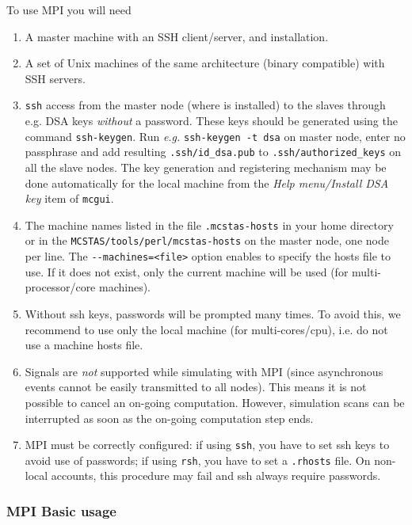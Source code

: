 To use MPI you will need
  \begin{enumerate}
  \item{A master machine with an SSH client/server, and \MCS installation.}
  \item{A set of Unix machines of the same architecture (binary compatible) with
      SSH servers.}
  \item{ \texttt{ssh} access from the master node (where \MCS is
      installed) to the slaves through e.g. DSA keys \emph{without} a
      password. These keys should be generated using the command
      \texttt{ssh-keygen}. Run \emph{e.g.} \texttt{ssh-keygen -t dsa} on
      master node, enter no passphrase and add resulting
      \texttt{.ssh/id\_dsa.pub} to \texttt{.ssh/authorized\_keys}
      on all the slave nodes. The key generation and registering mechanism
      may be done automatically for the local machine from the
      \emph{Help menu/Install DSA key} item of \verb+mcgui+.}
  \item{The machine names listed in the file \texttt{.mcstas-hosts} in
      your home directory or in the \texttt{MCSTAS/tools/perl/mcstas-hosts} on
      the master node, one node per line. The \verb'--machines=<file>' option
      enables to specify the hosts file to use. If it does not exist, only
      the current machine will be used (for multi-processor/core machines).}
  \item{Without ssh keys, passwords will be prompted many times. To avoid this,
      we recommend to use only the local machine (for multi-cores/cpu), i.e. do
      not use a machine hosts file.}
  \item Signals are \emph{not} supported while simulating with MPI (since
    asynchronous events cannot be easily transmitted to all nodes). This
    means it is not possible to cancel an on-going computation. However,
    simulation scans can be interrupted as soon as the on-going computation
    step ends.
  \item MPI must be correctly configured: if using \verb'ssh', you
    have to set ssh keys to avoid use of passwords; if
    using \verb'rsh', you have to set a \verb'.rhosts' file.
    On non-local accounts, this procedure may fail and ssh always require passwords.
  \end{enumerate}

\subsubsection{MPI Basic usage}

